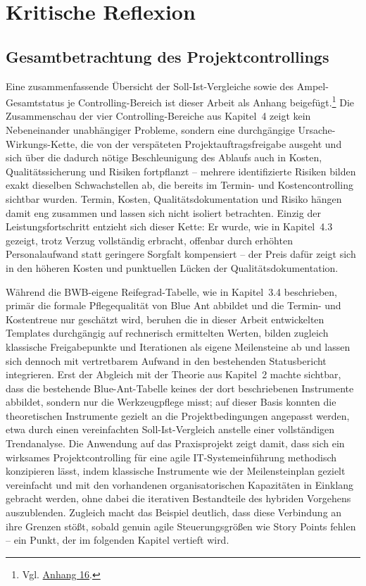 \documentclass[
    12pt, 
    a4paper,
    ]{scrartcl} %
\begin{document}
\section{Kritische Reflexion}
\subsection{Gesamtbetrachtung des Projektcontrollings}
Eine zusammenfassende Übersicht der Soll-Ist-Vergleiche sowie des Ampel-Gesamtstatus je Controlling-Bereich ist dieser Arbeit als Anhang beigefügt.\footnote{Vgl. \hyperref[sec:Anhang16]{Anhang 16}.} Die Zusammenschau der vier Controlling-Bereiche aus Kapitel~4 zeigt kein Nebeneinander unabhängiger Probleme, sondern eine durchgängige Ursache-Wirkungs-Kette, die von der verspäteten Projektauftragsfreigabe ausgeht und sich über die dadurch nötige Beschleunigung des Ablaufs auch in Kosten, Qualitätssicherung und Risiken fortpflanzt -- mehrere identifizierte Risiken bilden exakt dieselben Schwachstellen ab, die bereits im Termin- und Kostencontrolling sichtbar wurden. Termin, Kosten, Qualitätsdokumentation und Risiko hängen damit eng zusammen und lassen sich nicht isoliert betrachten. Einzig der Leistungsfortschritt entzieht sich dieser Kette: Er wurde, wie in Kapitel~4.3 gezeigt, trotz Verzug vollständig erbracht, offenbar durch erhöhten Personalaufwand statt geringere Sorgfalt kompensiert -- der Preis dafür zeigt sich in den höheren Kosten und punktuellen Lücken der Qualitätsdokumentation.

Während die BWB-eigene Reifegrad-Tabelle, wie in Kapitel~3.4 beschrieben, primär die formale Pflegequalität von Blue Ant abbildet und die Termin- und Kostentreue nur geschätzt wird, beruhen die in dieser Arbeit entwickelten Templates durchgängig auf rechnerisch ermittelten Werten, bilden zugleich klassische Freigabepunkte und Iterationen als eigene Meilensteine ab und lassen sich dennoch mit vertretbarem Aufwand in den bestehenden Statusbericht integrieren. Erst der Abgleich mit der Theorie aus Kapitel~2 machte sichtbar, dass die bestehende Blue-Ant-Tabelle keines der dort beschriebenen Instrumente abbildet, sondern nur die Werkzeugpflege misst; auf dieser Basis konnten die theoretischen Instrumente gezielt an die Projektbedingungen angepasst werden, etwa durch einen vereinfachten Soll-Ist-Vergleich anstelle einer vollständigen Trendanalyse.
Die Anwendung auf das Praxisprojekt zeigt damit, dass sich ein wirksames Projektcontrolling für eine agile IT-Systemeinführung methodisch konzipieren lässt, indem klassische Instrumente wie der Meilensteinplan gezielt vereinfacht und mit den vorhandenen organisatorischen Kapazitäten in Einklang gebracht werden, ohne dabei die iterativen Bestandteile des hybriden Vorgehens auszublenden. Zugleich macht das Beispiel deutlich, dass diese Verbindung an ihre Grenzen stößt, sobald genuin agile Steuerungsgrößen wie Story Points fehlen -- ein Punkt, der im folgenden Kapitel vertieft wird.
\end{document}
